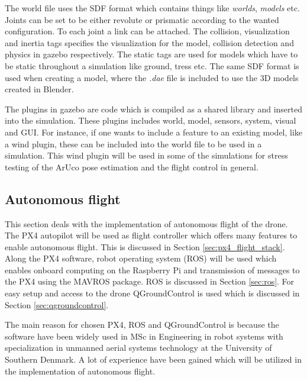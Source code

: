 \documentclass[../Head/report.tex]{subfiles}
\begin{document}
The world file uses the SDF format which contains things like \textit{worlds}, \textit{models} etc. Joints can be set to be either revolute or prismatic according to the wanted configuration. To each joint a link can be attached. The collision, visualization and inertia tags specifies the visualization for the model, collision detection and physics in gazebo respectively. The static tags are used for models which have to be static throughout a simulation like ground, tress etc. The same SDF format is used when creating a model, where the \textit{.dae} file is included to use the 3D models created in Blender.  

The plugins in gazebo are code which is compiled as a shared library and inserted into the simulation. These plugins includes world, model, sensors, system, visual and GUI. For instance, if one wants to include a feature to an existing model, like a wind plugin, these can be included into the world file to be used in a simulation. This wind plugin will be used in some of the simulations for stress testing of the ArUco pose estimation and the flight control in general. 

\subsection{Autonomous flight}

This section deals with the implementation of autonomous flight of the drone. The PX4 autopilot will be used as flight controller which offers many features to enable autonomous flight. This is discussed in Section \ref{sec:px4_flight_stack}. Along the PX4 software, robot operating system (ROS) will be used which enables onboard computing on the Raspberry Pi and transmission of messages to the PX4 using the MAVROS package. ROS is discussed in Section \ref{sec:ros}. For easy setup and access to the drone QGroundControl is used which is discussed in Section \ref{sec:qgroundcontrol}. 

The main reason for chosen PX4, ROS and QGroundControl is because the software have been widely used in MSc in Engineering in robot systems with
specialization in unmanned aerial systems technology at the University of Southern Denmark. A lot of experience have been gained which will be utilized in the implementation of autonomous flight.
\end{document}
